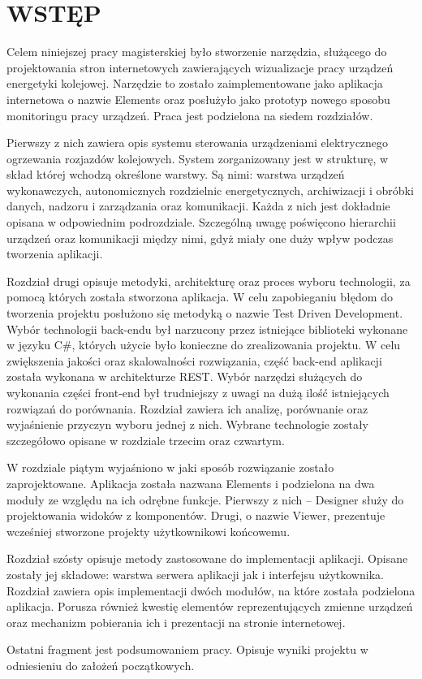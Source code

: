 \chapter*{WSTĘP}

Celem niniejszej pracy magisterskiej było stworzenie narzędzia, służącego do projektowania stron internetowych zawierających wizualizacje pracy urządzeń energetyki kolejowej. Narzędzie to zostało zaimplementowane jako aplikacja internetowa o nazwie Elements oraz posłużyło jako prototyp nowego sposobu monitoringu pracy urządzeń. Praca jest podzielona na siedem rozdziałów.

Pierwszy z nich zawiera opis systemu sterowania urządzeniami elektrycznego ogrzewania rozjazdów kolejowych. System zorganizowany jest w strukturę, w skład której wchodzą określone warstwy. Są nimi: warstwa urządzeń wykonawczych, autonomicznych rozdzielnic energetycznych, archiwizacji i obróbki danych, nadzoru i zarządzania oraz komunikacji. Każda z nich jest dokładnie opisana w odpowiednim podrozdziale. Szczególną uwagę poświęcono hierarchii urządzeń oraz komunikacji między nimi, gdyż miały one duży wpływ podczas tworzenia aplikacji.

Rozdział drugi opisuje metodyki, architekturę oraz proces wyboru technologii, za pomocą których została stworzona aplikacja. W celu zapobieganiu błędom do tworzenia projektu posłużono się metodyką o nazwie Test Driven Development. Wybór technologii back-endu był narzucony przez istniejące biblioteki wykonane w języku C\#, których użycie było konieczne do zrealizowania projektu. W celu zwiększenia jakości oraz skalowalności rozwiązania, część back-end aplikacji została wykonana w architekturze REST. Wybór narzędzi służących do wykonania części front-end był trudniejszy z uwagi na dużą ilość istniejących rozwiązań do porównania. Rozdział zawiera ich analizę, porównanie oraz wyjaśnienie przyczyn wyboru jednej z nich. Wybrane technologie zostały szczegółowo opisane w rozdziale trzecim oraz czwartym.

W rozdziale piątym wyjaśniono w jaki sposób rozwiązanie zostało zaprojektowane. Aplikacja została nazwana Elements i podzielona na dwa moduły ze względu na ich odrębne funkcje. Pierwszy z nich -- Designer służy do projektowania widoków z komponentów. Drugi, o nazwie Viewer, prezentuje wcześniej stworzone projekty użytkownikowi końcowemu.

Rozdział szósty opisuje metody zastosowane do implementacji aplikacji. Opisane zostały jej składowe: warstwa serwera aplikacji jak i interfejsu użytkownika. Rozdział zawiera opis implementacji dwóch modułów, na które została podzielona aplikacja. Porusza również kwestię elementów reprezentujących zmienne urządzeń oraz mechanizm pobierania ich i prezentacji na stronie internetowej.

Ostatni fragment jest podsumowaniem pracy. Opisuje wyniki projektu w odniesieniu do założeń początkowych.